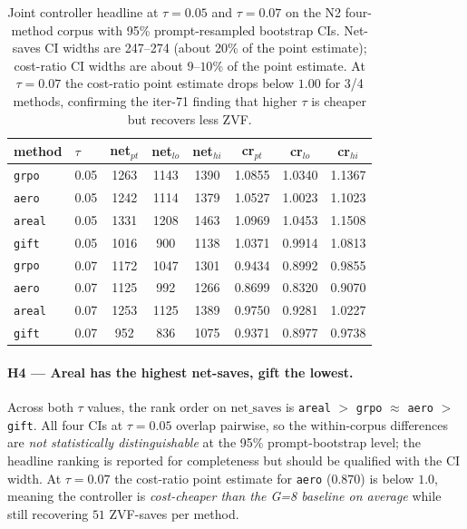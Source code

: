 \documentclass{article}
\begin{document}
\begin{table}[t]
\centering\small
\caption{Joint controller headline at $\tau{=}0.05$ and $\tau{=}0.07$
on the N2 four-method corpus with 95\% prompt-resampled bootstrap
CIs.  Net-saves CI widths are 247--274 (about 20\% of the point
estimate); cost-ratio CI widths are about $9$--$10$\% of the point
estimate.  At $\tau{=}0.07$ the cost-ratio point estimate drops
below $1.00$ for 3/4 methods, confirming the iter-71 finding that
higher $\tau$ is cheaper but recovers less ZVF.}
\label{tab:p7-joint-ci}
\begin{tabular}{llcccccc}
\toprule
method & $\tau$ & net$_{pt}$ & net$_{lo}$ & net$_{hi}$ & cr$_{pt}$ & cr$_{lo}$ & cr$_{hi}$ \\
\midrule
\texttt{grpo}  & 0.05 & 1263 & 1143 & 1390 & 1.0855 & 1.0340 & 1.1367 \\
\texttt{aero}  & 0.05 & 1242 & 1114 & 1379 & 1.0527 & 1.0023 & 1.1023 \\
\texttt{areal} & 0.05 & 1331 & 1208 & 1463& 1.0969 & 1.0453 & 1.1508 \\
\texttt{gift}  & 0.05 & 1016 &  900 & 1138 & 1.0371 & 0.9914 & 1.0813 \\
\midrule
\texttt{grpo}  & 0.07 & 1172 & 1047 & 1301 & 0.9434 & 0.8992 & 0.9855 \\
\texttt{aero}  & 0.07 & 1125 &  992 & 1266 & 0.8699 & 0.8320 & 0.9070 \\
\texttt{areal} & 0.07 & 1253 & 1125 & 1389 & 0.9750 & 0.9281 & 1.0227 \\
\texttt{gift}  & 0.07 &  952 &  836 & 1075 & 0.9371 & 0.8977 & 0.9738 \\
\bottomrule
\end{tabular}
\end{table}

\paragraph{H4 --- Areal has the highest net-saves, gift the lowest.}
Across both $\tau$ values, the rank order on $\mathrm{net\_saves}$
is \texttt{areal} $>$ \texttt{grpo} $\approx$ \texttt{aero} $>$
\texttt{gift}.  All four CIs at $\tau{=}0.05$ overlap pairwise, so
the within-corpus differences are \emph{not statistically
distinguishable} at the 95\% prompt-bootstrap level; the headline
ranking is reported for completeness but should be qualified with
the CI width.  At $\tau{=}0.07$ the cost-ratio point estimate for
\texttt{aero} ($0.870$) is below $1.0$, meaning the controller is
\emph{cost-cheaper than the G=8 baseline on average} while still
recovering $51$ ZVF-saves per method.
\end{document}
